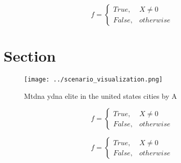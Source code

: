 \documentclass[a4paper]{article}
\begin{document}
\begin{equation}   f =
\begin{cases} True, & X \neq 0\\
False, & otherwise
\end{cases}
\end{equation}

\section{Section}

\begin{figure}
\centering
\texttt{[image: ../scenario\_visualization.png]}
\caption{Mtdna ydna elite in the united states cities by A
}
\end{figure}
 
\begin{equation}   f =
\begin{cases} True, & X \neq 0\\
False, & otherwise
\end{cases}
\end{equation}

\begin{equation}   f =
\begin{cases} True, & X \neq 0\\
False, & otherwise
\end{cases}
\end{equation}
\end{document}
